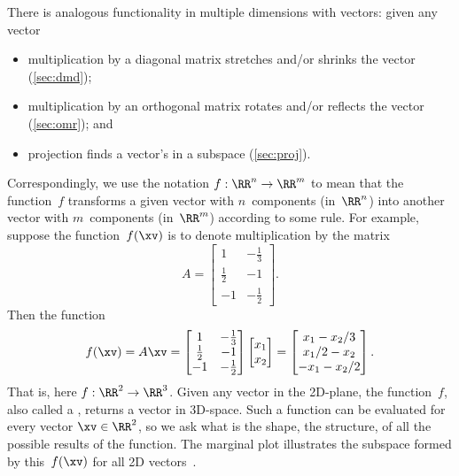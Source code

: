 There is analogous functionality in multiple dimensions with vectors: given any vector 
\begin{itemize}
\item multiplication by a diagonal matrix stretches and/or shrinks the vector (\cref{sec:dmd});
\item multiplication by an orthogonal matrix rotates and/or reflects the vector (\cref{sec:omr});
and \item projection finds a vector's  in a subspace (\cref{sec:proj}).
\end{itemize}
Correspondingly, we use the notation \(f:\RR^n\to\RR^m\) to mean that the function~\(f\) transforms a given vector with \(n\)~components (in~\(\RR^n\)) into another vector with \(m\)~components (in~\(\RR^m\)) according to some rule. 
For example, suppose the function~\(f(\xv)\) is to denote multiplication by the matrix
\begin{equation*}
A=\begin{bmatrix} 1&-\frac13\\\frac12&-1\\-1&-\frac12 \end{bmatrix}.
\end{equation*}
Then the function
\begin{equation*}
f(\xv)=A\xv
=\begin{bmatrix} 1&-\frac13\\\frac12&-1\\-1&-\frac12 \end{bmatrix}\begin{bmatrix} x_1\\x_2 \end{bmatrix}
=\begin{bmatrix} x_1-x_2/3\\x_1/2-x_2\\-x_1-x_2/2 \end{bmatrix}.
\end{equation*}
%
That is, here \(f:\RR^2\to\RR^3\).  
Given any vector in the 2D-plane, the function~\(f\), also called a , returns a vector in 3D-space.  
Such a function can be evaluated for every vector \(\xv\in\RR^2\), so we ask what is the shape, the structure, of all the possible results of the function.
The marginal plot illustrates the subspace formed by this~\(f(\xv)\) for all 2D vectors~\xv.


